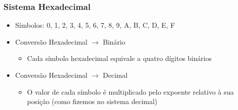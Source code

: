 \documentclass[aspectratio=169,
				xcolor=table]{beamer}
\begin{document}
		
		\begin{frame}
			\frametitle{Sistema Hexadecimal}
			\begin{itemize}
				\item Símbolos: 0, 1, 2, 3, 4, 5, 6, 7, 8, 9, A, B, C, D, E, F
				\vspace{1em}
				
				\item Conversão Hexadecimal $\to$ Binário
				\begin{itemize}
					\item Cada \alert{símbolo hexadecimal} equivale a \alert{quatro dígitos binários}\\
				\end{itemize}
				\vspace{1em}
				
				\item Conversão Hexadecimal $\to$ Decimal
				\begin{itemize}
					\item O valor de cada símbolo é multiplicado pelo expoente relativo à sua posição (como fizemos no sistema decimal)
				\end{itemize}
			\end{itemize}
		\end{frame}
		
\end{document}
